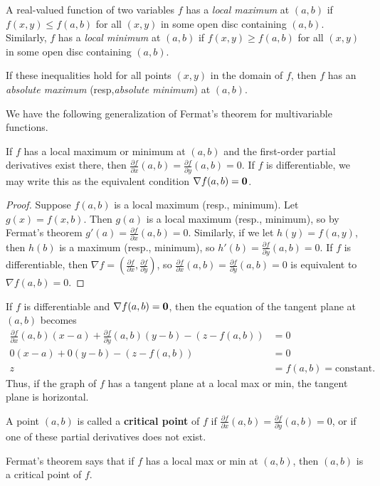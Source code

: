 \documentclass[12pt,letterpaper,reqno]{article}
\numberwithin{equation}{section}
\begin{document}
{\begin{defn}
	A real-valued function of two variables $f$ has a \emph{local maximum} at $(a,b)$ if $f(x,y) \leq f(a,b)$ for all $(x,y)$ in some open disc containing $(a,b)$. Similarly, $f$ has a \emph{local minimum} at $(a,b)$ if $f(x,y) \geq f(a,b)$ for all $(x,y)$ in some open disc containing $(a,b)$.
	
	If these inequalities hold for all points $(x,y)$ in the domain of $f$, then $f$ has an \emph{absolute maximum} (resp,\emph{absolute minimum}) at $(a,b)$.
\end{defn}
We have the following generalization of Fermat's theorem for multivariable functions.

\begin{thm}
If $f$ has a local maximum or minimum at $(a,b)$ and the first-order partial derivatives exist there, then $\frac{\partial f}{\partial x}(a,b)=	\frac{\partial f}{\partial y}(a,b)=0$. If $f$ is differentiable, we may write this as the equivalent condition $\nabla f(a,b)={\bf 0}$.	
\end{thm}

\begin{proof}
	Suppose $f(a,b)$ is a local maximum (resp., minimum). Let $g(x)=f(x,b)$. Then $g(a)$ is a local maximum (resp., minimum), so by Fermat's theorem $g'(a)=\frac{\partial f}{\partial x}(a,b)=0$. Similarly, if we let $h(y)=f(a,y)$, then $h(b)$ is a maximum (resp., minimum), so $h'(b)=\frac{\partial f}{\partial y}(a,b)=0$. If $f$ is differentiable, then $\nabla f=(\frac{\partial f}{\partial x}, \frac{\partial f}{\partial y})$, so $\frac{\partial f}{\partial x}(a,b)=\frac{\partial f}{\partial y}(a,b)=0$ is equivalent to $\nabla f(a,b)=0$. 
\end{proof}
If $f$ is differentiable and $\nabla f(a,b)={\bf 0}$, then the equation of the tangent plane at $(a,b)$ becomes 
\begin{align*}
\frac{\partial f}{\partial x}(a,b)(x-a)+	\frac{\partial f}{\partial y}(a,b)(y-b)-(z-f(a,b))&=0 \\
0(x-a)+	0(y-b)-(z-f(a,b))&=0 \\
z&=f(a,b)=\text{constant}.
\end{align*}
Thus, if the graph of $f$ has a tangent plane at a local max or min, the tangent plane is horizontal.
\begin{defn}
A point $(a,b)$ is called a {\bf critical point} of $f$ if $\frac{\partial f}{\partial x}(a,b)=\frac{\partial f}{\partial y}(a,b)=0$, or if one of these partial derivatives does not exist.	
\end{defn}
Fermat's theorem says that if $f$ has a local max or min at $(a,b)$, then $(a,b)$ is a critical point of $f$. 

}
\end{document}

